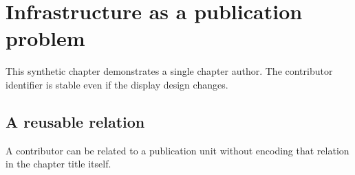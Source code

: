 \chapter{Infrastructure as a publication problem}
This synthetic chapter demonstrates a single chapter author. The contributor identifier is stable even if the display design changes.

\section{A reusable relation}
A contributor can be related to a publication unit without encoding that relation in the chapter title itself.
